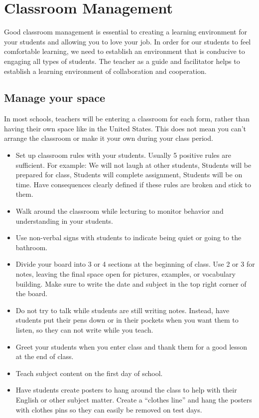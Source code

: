 \chapter{Classroom Management}
Good classroom management is essential to creating a learning environment for your students and allowing you to love your job.  In order for our students to feel comfortable learning, we need to establish an environment that is conducive to engaging all types of students.  The teacher as a guide and facilitator helps to establish a learning environment of collaboration and cooperation.

\section{Manage your space}
In most schools, teachers will be entering a classroom for each form, rather than having their own space like in the United States.  This does not mean you can't arrange the classroom or make it your own during your class period.   

\begin{itemize}
 \item Set up classroom rules with your students. Usually 5 positive rules are sufficient. For example: We will not laugh at other students, Students will be prepared for class, Students will complete assignment, Students will be on time.  Have consequences clearly defined if these rules are broken and stick to them.  
 \item Walk around the classroom while lecturing to monitor behavior and understanding in your students.  
 \item Use non-verbal signs with students to indicate being quiet or going to the bathroom.
 \item Divide your board into 3 or 4 sections at the beginning of class.  Use 2 or 3 for notes, leaving the final space open for pictures, examples, or vocabulary building. Make sure to write the date and subject in the top right corner of the board.
 \item Do not try to talk while students are still writing notes. Instead, have students put their pens down or in their pockets when you want them to listen, so they can not write while you teach.
 \item Greet your students when you enter class and thank them for a good lesson at the end of class.
 \item Teach subject content on the first day of school.
 \item Have students create posters to hang around the class to help with their English or other subject matter.  Create a ``clothes line'' and hang the posters with clothes pins so they can easily be removed on test days.
\end{itemize}

